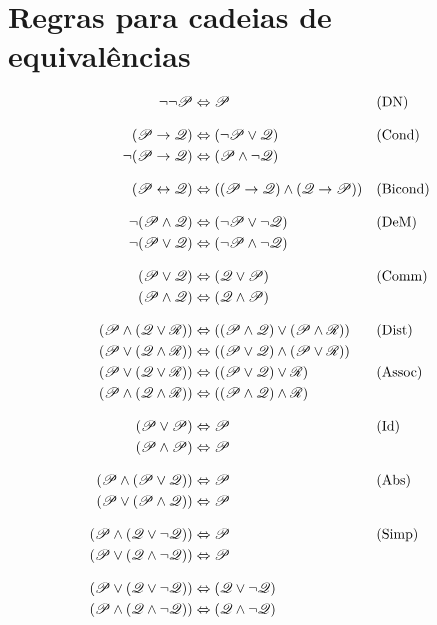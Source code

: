 \section{Regras para cadeias de equivalências}

\ifHTMLtarget
\begin{align*}
\lnot\lnot \mathscr{P} & \Leftrightarrow \mathscr{P} && \text{(DN)}\\[2ex]
(\mathscr{P} \rightarrow \mathscr{Q}) & \Leftrightarrow (\lnot \mathscr{P} \lor \mathscr{Q})
&& \text{(Cond)}\\
\lnot(\mathscr{P} \rightarrow \mathscr{Q}) & \Leftrightarrow (\mathscr{P} \land \lnot\mathscr{Q}) \\[2ex]
(\mathscr{P} \leftrightarrow \mathscr{Q}) & \Leftrightarrow ((\mathscr{P} \rightarrow \mathscr{Q}) \land  (\mathscr{Q} \rightarrow \mathscr{P}))
&& \text{(Bicond)}\\[2ex]
\lnot(\mathscr{P} \land \mathscr{Q}) & \Leftrightarrow (\lnot\mathscr{P} \lor \lnot\mathscr{Q})
&& \text{(DeM)}\\
\lnot(\mathscr{P} \lor \mathscr{Q}) & \Leftrightarrow (\lnot\mathscr{P} \land \lnot\mathscr{Q}) \\[2ex]
(\mathscr{P} \lor \mathscr{Q}) & \Leftrightarrow (\mathscr{Q} \lor \mathscr{P}) & &\text{(Comm)}\\
(\mathscr{P} \land \mathscr{Q}) & \Leftrightarrow (\mathscr{Q} \land \mathscr{P})\\[2ex]
(\mathscr{P} \land (\mathscr{Q} \lor \mathscr{R})) & \Leftrightarrow ((\mathscr{P} \land \mathscr{Q}) \lor (\mathscr{P} \land \mathscr{R}))
&& \text{(Dist)}\\
(\mathscr{P} \lor (\mathscr{Q} \land \mathscr{R})) & \Leftrightarrow ((\mathscr{P} \lor \mathscr{Q}) \land (\mathscr{P} \lor \mathscr{R}))\\
(\mathscr{P} \lor (\mathscr{Q} \lor \mathscr{R})) & \Leftrightarrow ((\mathscr{P} \lor \mathscr{Q}) \lor \mathscr{R}) & &\text{(Assoc)}\\
(\mathscr{P} \land (\mathscr{Q} \land \mathscr{R})) & \Leftrightarrow ((\mathscr{P} \land \mathscr{Q}) \land \mathscr{R})\\[2ex]
(\mathscr{P} \lor \mathscr{P}) & \Leftrightarrow \mathscr{P} && \text{(Id)}\\
(\mathscr{P} \land \mathscr{P}) & \Leftrightarrow \mathscr{P}\\[2ex]
(\mathscr{P} \land (\mathscr{P} \lor \mathscr{Q})) & \Leftrightarrow \mathscr{P}&& \text{(Abs)}\\
(\mathscr{P} \lor (\mathscr{P} \land \mathscr{Q})) & \Leftrightarrow \mathscr{P}\\[2ex]
(\mathscr{P} \land (\mathscr{Q} \lor \lnot\mathscr{Q})) & \Leftrightarrow \mathscr{P}  && \text{(Simp)}\\
(\mathscr{P} \lor (\mathscr{Q} \land \lnot\mathscr{Q})) & \Leftrightarrow \mathscr{P}\\[2ex]
(\mathscr{P} \lor (\mathscr{Q} \lor \lnot\mathscr{Q})) & \Leftrightarrow (\mathscr{Q} \lor \lnot\mathscr{Q}) \\
(\mathscr{P} \land (\mathscr{Q} \land \lnot\mathscr{Q})) & \Leftrightarrow (\mathscr{Q} \land \lnot\mathscr{Q})
\end{align*}
\else


